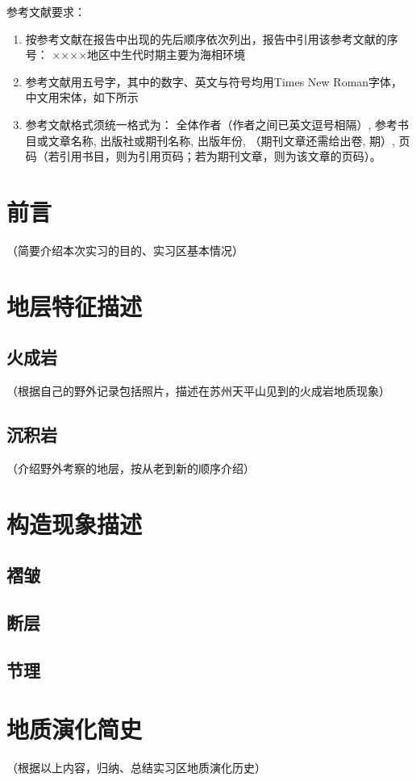 \documentclass{fieldpractice-geo}
\begin{document}
参考文献要求：
\begin{enumerate}
	\item 按参考文献在报告中出现的先后顺序依次列出，报告中引用该参考文献的序号：
	××××地区中生代时期主要为海相环境\cite{地质学基础}
	\item 参考文献用五号字，其中的数字、英文与符号均用Times New Roman字体，中文用宋体，如下所示
	\item 参考文献格式须统一格式为：
	全体作者（作者之间已英文逗号相隔）, 参考书目或文章名称, 出版社或期刊名称, 出版年份, （期刊文章还需给出卷, 期）, 页码（若引用书目，则为引用页码；若为期刊文章，则为该文章的页码）。
\end{enumerate}

\section{前言}
（简要介绍本次实习的目的、实习区基本情况）

\section{地层特征描述}
\subsection{火成岩}
（根据自己的野外记录包括照片，描述在苏州天平山见到的火成岩地质现象）
\subsection{沉积岩}
（介绍野外考察的地层，按从老到新的顺序介绍）
\subsubsection{}

\section{构造现象描述}
\subsection{褶皱}
\zhlipsum[1]
\subsection{断层}
\zhlipsum[2]

\zhlipsum[4]
\subsection{节理}
\zhlipsum[3]

\section{地质演化简史}
（根据以上内容，归纳、总结实习区地质演化历史）


\geobibstyle

% 
\end{document}
